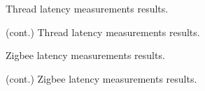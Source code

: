 
\begin{figure}
    \centering
    \caption{Thread latency measurements results.}
\end{figure}

\begin{figure}
    \centering
    \caption{(cont.) Thread latency measurements results.}
\end{figure}

\begin{figure}
    \centering
    \caption{Zigbee latency measurements results.}
\end{figure}

\begin{figure}
    \centering
    \caption{(cont.) Zigbee latency measurements results.}
\end{figure}
